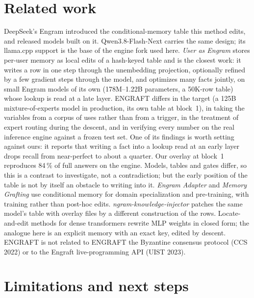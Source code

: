 \documentclass[10pt,a4paper]{article}
\begin{document}
\section{Related work}

DeepSeek's Engram \cite{engram} introduced the conditional-memory table this method
edits, and released models built on it. Qwen3.8-Flash-Next carries the same design; its
llama.cpp support \cite{pr27742} is the base of the engine fork used here. \emph{User as
Engram} \cite{userengram} stores per-user memory as local edits of a hash-keyed table and
is the closest work: it writes a row in one step through the unembedding projection,
optionally refined by a few gradient steps through the model, and optimizes many facts
jointly, on small Engram models of its own (178M--1.22B parameters, a 50K-row table) whose
lookup is read at a late layer. ENGRAFT differs in the target (a 125B mixture-of-experts
model in production, its own table at block~1), in taking the variables from a corpus of
uses rather than from a trigger, in the treatment of expert routing during the descent,
and in verifying every number on the real inference engine against a frozen test set.
One of its findings is worth setting against ours: it reports that writing a fact into a
lookup read at an early layer drops recall from near-perfect to about a quarter. Our
overlay at block~1 reproduces 84\,\% of full answers on the engine. Models, tables and
gates differ, so this is a contrast to investigate, not a contradiction; but the early
position of the table is not by itself an obstacle to writing into it. \emph{Engram
Adapter} \cite{engramadapter} and \emph{Memory Grafting} \cite{memorygrafting} use
conditional memory for domain specialization and pre-training, with training rather than
post-hoc edits. \emph{ngram-knowledge-injector} \cite{nki} patches the same model's table
with overlay files by a different construction of the rows. Locate-and-edit methods for
dense transformers \cite{rome,memit} rewrite MLP weights in closed form; the analogue here
is an explicit memory with an exact key, edited by descent. ENGRAFT is not related to
ENGRAFT the Byzantine consensus protocol (CCS 2022) or to the Engraft live-programming
API (UIST 2023).

\section{Limitations and next steps}
\label{sec:next}
\end{document}
